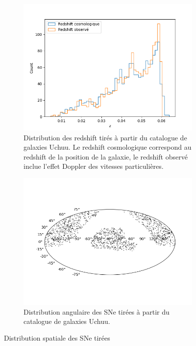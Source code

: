 \documentclass{book}
\begin{document}
\begin{figure}[h]
	\centering
	\begin{subfigure}[c]{0.45\textwidth}
		\includegraphics[width=\textwidth]{figures/redshift_draw.png}
		\caption{Distribution des redshift tirés à partir du catalogue de galaxies Uchuu. Le redshift cosmologique correspond au redshift de la position de la galaxie, le redshift observé inclue l'effet Doppler des vitesses particulières.}
		\label{fig:z_draw}
	\end{subfigure}
	\hfill
	\begin{subfigure}[c]{0.5\textwidth}
		\centering
		\includegraphics[width=\textwidth, trim={1cm 2.5cm 1cm 2.5cm}, clip]{figures/angular_draw.png}
		\caption{Distribution angulaire des SNe tirées à partir du catalogue de galaxies Uchuu.}
		\label{fig:ang_draw}
	\end{subfigure}
	
	\caption{Distribution spatiale des SNe tirées}
\end{figure}
\end{document}
